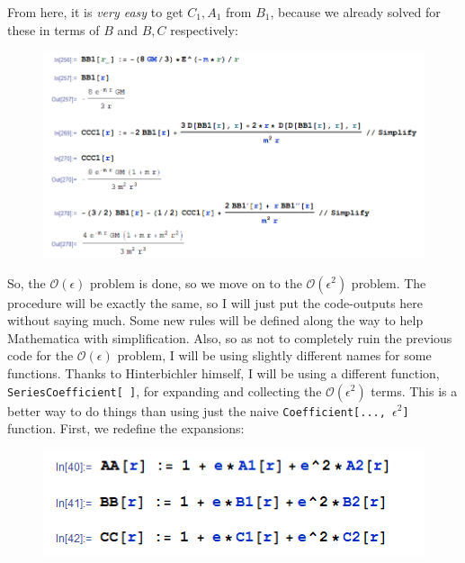 \documentclass{book}
\theoremstyle{definition}
\newcommand*\widefbox[1]{\fbox{\hspace{2em}#1\hspace{2em}}}
\newcommand{\f}[2]{\frac{#1}{#2}}
\begin{document}
From here, it is \textit{very easy} to get $C_1, A_1$ from $B_1$, because we already solved for these in terms of $B$ and $B,C$ respectively:
\begin{figure}[!htb]
	\centering
	\includegraphics[scale=0.4]{ABC}
\end{figure}

So, the $\mathcal{O}(\epsilon)$ problem is done, so we move on to the $\mathcal{O}(\epsilon^2)$ problem. The procedure will be exactly the same, so I will just put the code-outputs here without saying much. Some new rules will be defined along the way to help Mathematica with simplification. Also, so as not to completely ruin the previous code for the $\mathcal{O}(\epsilon)$ problem, I will be using slightly different names for some functions. Thanks to Hinterbichler himself, I will be using a different function, \texttt{SeriesCoefficient[ ]}, for expanding and collecting the $\mathcal{O}(\epsilon^2)$ terms. This is a better way to do things than using just the naive \texttt{Coefficient[..., $\epsilon^2$]} function. First, we redefine the expansions:
\begin{figure}[!htb]
	\centering
	\includegraphics[scale=0.25]{expansions}
\end{figure}
\end{document}
